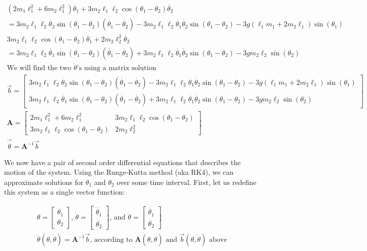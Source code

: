 \documentclass[]{article}
\begin{document}
\begin{gather*}
	(2m_1\ell_1^2 + 6m_2\ell_1^2)\ddot{\theta_1} + 3m_2\ell_1\ell_2\cos(\theta_1 - \theta_2)\ddot{\theta_2} \\
	= 3 m_2\ell_1\ell_2\dot{\theta_2}\sin(\theta_1 - \theta_2)(\dot{\theta_1} - \dot{\theta_2}) - 3m_2\ell_1\ell_2\dot{\theta_1}\dot{\theta_2}\sin(\theta_1 - \theta_2) - 3g(\ell_1m_1 + 2m_2\ell_1)\sin(\theta_1) \\
	3m_2\ell_1\ell_2\cos(\theta_1 - \theta_2)\ddot{\theta_1} + 2m_2\ell_2^2\ddot{\theta_2} \\ 
	= 3m_2\ell_1\ell_2\dot{\theta_1}\sin(\theta_1 - \theta_2)(\dot{\theta_1} - \dot{\theta_2}) + 3m_2\ell_1\ell_2\dot{\theta_1}\dot{\theta_2}\sin(\theta_1 - \theta_2) - 3g m_2\ell_2\sin(\theta_2) \\
	\text{We will find the two $\ddot{\theta}$'s using a matrix solution} \\
	\vec{b} = \begin{bmatrix}
		3 m_2\ell_1\ell_2\dot{\theta_2}\sin(\theta_1 - \theta_2)(\dot{\theta_1} - \dot{\theta_2}) - 3m_2\ell_1\ell_2\dot{\theta_1}\dot{\theta_2}\sin(\theta_1 - \theta_2) - 3g(\ell_1m_1 + 2m_2\ell_1)\sin(\theta_1) \\
		3m_2\ell_1\ell_2\dot{\theta_1}\sin(\theta_1 - \theta_2)(\dot{\theta_1} - \dot{\theta_2}) + 3m_2\ell_1\ell_2\dot{\theta_1}\dot{\theta_2}\sin(\theta_1 - \theta_2) - 3g m_2\ell_2\sin(\theta_2)
	\end{bmatrix} \\
	\boldsymbol{A} = \begin{bmatrix}
		2m_1\ell_1^2 + 6m_2\ell_1^2 & 3m_2\ell_1\ell_2\cos(\theta_1 - \theta_2) \\
		3m_2\ell_1\ell_2\cos(\theta_1 - \theta_2) & 2m_2\ell_2^2
	\end{bmatrix} \\
	\vec{\ddot{\theta}} = \boldsymbol{A}^{-1}\vec{b}
\end{gather*}

We now have a pair of second order differential equations that describes the motion of the system. Using the Runge-Kutta method (aka RK4), we can approximate solutions for $\theta_1$ and $\theta_2$ over some time interval. First, let us redefine this system as a single vector function:

\begin{gather*}
	\theta = 
	\begin{bmatrix}
		\theta_1 \\
		\theta_2
	\end{bmatrix} \text{, }
	\dot{\theta} = 
	\begin{bmatrix}
		\dot{\theta_1} \\
		\dot{\theta_2}
	\end{bmatrix} \text{, and }
	\ddot{\theta} =
	\begin{bmatrix}
		\ddot{\theta_1} \\
		\ddot{\theta_2}
	\end{bmatrix} \\
	\ddot{\theta}(\theta, \dot{\theta}) = \boldsymbol{A}^{-1}\vec{b}\text{, according to $\boldsymbol{A}(\theta, \dot{\theta})$ and $\vec{b}(\theta, \dot{\theta})$ above}
\end{gather*}
\end{document}
